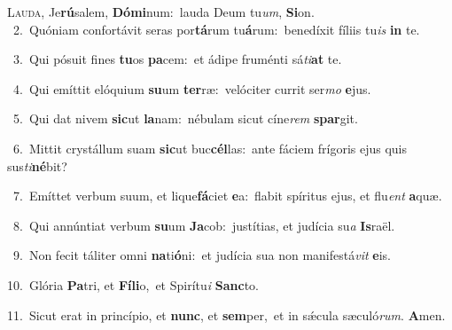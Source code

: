 \lettrine{\initial\textcolor{\initialcolor}{L}}{auda,} Je\-\textbf{rú}\-salem, \textbf{Dó}\-\textbf{mi}num:~\star lauda Deum tu\-\textit{um}\-, \textbf{Si}\-on.\\
{\numbfont\textcolor{\numbcolor}{~2.}}~Quóniam confortávit seras por\-\textbf{tá}\-rum tu\-\textbf{á}\-rum:~\star benedíxit fíliis tu\textit{is} \textbf{in} te.\par
{\numbfont\textcolor{\numbcolor}{~3.}}~Qui pósuit fines \textbf{tu}\-os \textbf{pa}\-cem:~\star et ádipe fruménti sá\-\textit{ti}\-\textbf{at} te.\par
{\numbfont\textcolor{\numbcolor}{~4.}}~Qui emíttit elóquium \textbf{su}\-um \textbf{ter}\-ræ:~\star velóciter currit ser\textit{mo} \textbf{e}\-jus.\par
{\numbfont\textcolor{\numbcolor}{~5.}}~Qui dat nivem \textbf{sic}\-ut \textbf{la}\-nam:~\star nébulam sicut cíne\textit{rem} \textbf{spar}\-git.\par
{\numbfont\textcolor{\numbcolor}{~6.}}~Mittit crystállum suam \textbf{sic}\-ut buc\-\textbf{cél}\-las:~\star ante fáciem frígoris ejus quis sus\-\textit{ti}\-\textbf{né}bit?\par
{\numbfont\textcolor{\numbcolor}{~7.}}~Emíttet verbum suum, et lique\-\textbf{fá}\-ciet \textbf{e}\-a:~\star flabit spíritus ejus, et flu\textit{ent} \textbf{a}\-quæ.\par
{\numbfont\textcolor{\numbcolor}{~8.}}~Qui annúntiat verbum \textbf{su}\-um \textbf{Ja}\-cob:~\star justítias, et judícia su\textit{a} \textbf{Is}\-raël.\par
{\numbfont\textcolor{\numbcolor}{~9.}}~Non fecit táliter omni \textbf{na}\-ti\-\textbf{ó}\-ni:~\star et judícia sua non manifestá\textit{vit} \textbf{e}\-is.\par
{\numbfont\textcolor{\numbcolor}{10.}}~Glória \textbf{Pa}\-tri, et \textbf{Fí}\-\textbf{li}o,~\star et Spirítu\textit{i} \textbf{Sanc}\-to.\par
{\numbfont\textcolor{\numbcolor}{11.}}~Sicut erat in princípio, et \textbf{nunc}\-, et \textbf{sem}\-per,~\star et in sǽcula sæculó\-\textit{rum}\-. \textbf{A}\-men.\par
